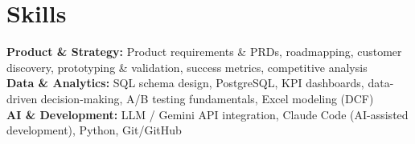 \documentclass[10pt,letterpaper]{article}
\begin{document}
\section*{Skills}
\textbf{Product \& Strategy:} Product requirements \& PRDs, roadmapping, customer discovery, prototyping \& validation, success metrics, competitive analysis\\[2pt]
\textbf{Data \& Analytics:} SQL schema design, PostgreSQL, KPI dashboards, data-driven decision-making, A/B testing fundamentals, Excel modeling (DCF)\\[2pt]
\textbf{AI \& Development:} LLM / Gemini API integration, Claude Code (AI-assisted development), Python, Git/GitHub
\end{document}
